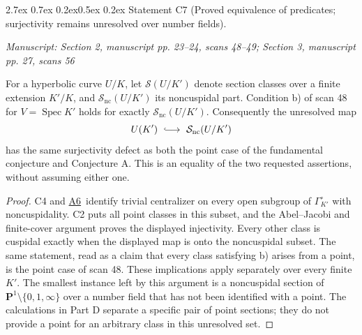 \documentclass[11pt,a4paper]{article}
\makeatletter
\newcommand{\passage}[1]{\par\smallskip\noindent\textit{Manuscript: #1}\par\smallskip}
\newcommand{\resref}[1]{\hyperref[res:#1]{#1}}
\newcommand{\Rtwo}{\resref{A6}}
\renewcommand\paragraph{\@startsection{paragraph}{4}{\z@}%
  {2.7ex \@plus 0.7ex \@minus 0.2ex}{0.5ex \@plus 0.2ex}%
  {\normalfont\normalsize\bfseries}}
\makeatother
\begin{document}
\paragraph{Statement C7 (Proved equivalence of predicates; surjectivity remains unresolved over number fields).}\label{res:C7}
\passage{Section 2, manuscript pp. 23–24, scans 48–49; Section 3, manuscript pp. 27, scans 56}

For a hyperbolic curve $U/K$, let $\mathcal S(U/K')$ denote section classes over a finite extension $K'/K$, and $\mathcal S_{\mathrm{nc}}(U/K')$ its noncuspidal part. Condition b) of scan 48 for $V=\operatorname{Spec}K'$ holds for exactly $\mathcal S_{\mathrm{nc}}(U/K')$. Consequently the unresolved map
\[
 U(K')\ \lhook\joinrel\longrightarrow\ \mathcal S_{\mathrm{nc}}(U/K')
\]
has the same surjectivity defect as both the point case of the fundamental conjecture and Conjecture A. This is an equality of the two requested assertions, without assuming either one.
\begin{proof}
C4 and \Rtwo\ identify trivial centralizer on every open subgroup of $\Gamma_{K'}^\circ$ with noncuspidality. C2 puts all point classes in this subset, and the Abel--Jacobi and finite-cover argument proves the displayed injectivity. Every other class is cuspidal exactly when the displayed map is onto the noncuspidal subset. The same statement, read as a claim that every class satisfying b) arises from a point, is the point case of scan 48. These implications apply separately over every finite $K'$. The smallest instance left by this argument is a noncuspidal section of $\mathbf P^1\setminus\{0,1,\infty\}$ over a number field that has not been identified with a point. The calculations in Part D separate a specific pair of point sections; they do not provide a point for an arbitrary class in this unresolved set.
\end{proof}

\end{document}
